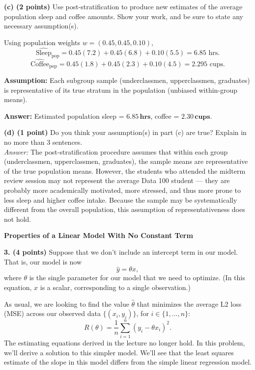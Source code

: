 \documentclass[11pt]{article}
\begin{document}
\newpage
\noindent \textbf{(c) (2 points)} Use post-stratification to produce new estimates of the average population sleep and coffee amounts. Show your work, and be sure to state any necessary assumption(s).

\medskip
\noindent
Using population weights \(w=(0.45, 0.45, 0.10)\),
\[
\widehat{\text{Sleep}}_{\text{pop}} = 
0.45(7.2) + 0.45(6.8) + 0.10(5.5)
= 6.85\text{ hrs.}
\]
\[
\widehat{\text{Coffee}}_{\text{pop}} = 
0.45(1.8) + 0.45(2.3) + 0.10(4.5)
= 2.295\text{ cups.}
\]

\noindent
\textbf{Assumption:} Each subgroup sample (underclassmen, upperclassmen, graduates) is representative of its true stratum in the population (unbiased within-group means).

\medskip
\noindent
\textbf{Answer:} Estimated population sleep = \(\mathbf{6.85\,hrs}\), coffee = \(\mathbf{2.30\,cups.}\)

\bigskip
\noindent \textbf{(d) (1 point)} Do you think your assumption(s) in part (c) are true? Explain in no more than 3 sentences.
\\
\noindent \textit{Answer:} The post-stratification procedure assumes that within 
each group (underclassmen, upperclassmen, graduates), the sample means are 
representative of the true population means. However, the students who attended the 
midterm review session may not represent the average Data 100 student — they are 
probably more academically motivated, more stressed, and thus more prone to less 
sleep and higher coffee intake. Because the sample may be systematically different 
from the overall population, this assumption of representativeness does not hold.
\newpage

\noindent\textbf{\LARGE Properties of a Linear Model With No Constant Term}

\medskip
\noindent \textbf{3. (4 points)} Suppose that we don’t include an intercept term in our model. That is, our model is now
\[
\hat{y}=\theta x,
\]
where $\theta$ is the single parameter for our model that we need to optimize. (In this equation, $x$ is a scalar, corresponding to a single observation.)

As usual, we are looking to find the value $\hat{\theta}$ that minimizes the average L2 loss (MSE) across our observed data $\{(x_i,y_i)\}$, for $i\in\{1,\dots,n\}$:
\[
R(\theta)=\frac{1}{n}\sum_{i=1}^{n}(y_i-\theta x_i)^2.
\]
The estimating equations derived in the lecture no longer hold. In this problem, we’ll derive a solution to this simpler model. We’ll see that the least squares estimate of the slope in this model differs from the simple linear regression model.
\end{document}
